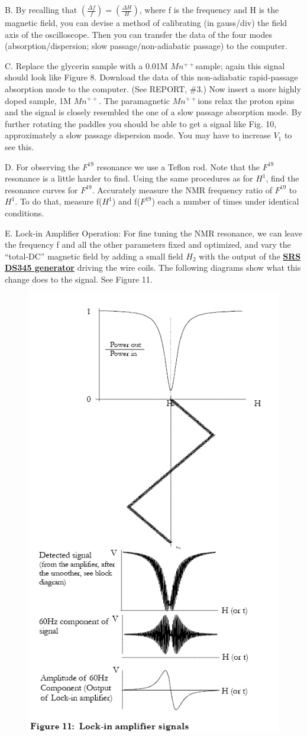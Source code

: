 \documentclass{../lab}
\begin{document}
B. By recalling that $ \left (\frac {\Delta f}{f} \right) = \left (\frac {\Delta H}{H} \right) $, where f is the frequency and H is the magnetic field, you can devise a method of calibrating (in gauss/div) the field axis of the oscilloscope. Then you can transfer the data of the four modes (absorption/dispersion; slow passage/non-adiabatic passage) to the computer.

C. Replace the glycerin sample with a 0.01M $Mn^{++}$sample; again this signal should look like Figure 8. Download the data of this non-adiabatic rapid-passage absorption mode to the computer. (See REPORT, \#3.) Now insert a more highly doped sample, 1M $Mn^{++}$. The paramagnetic $Mn^{++}$ions relax the proton spins and the signal is closely resembled the one of a slow passage absorption mode. By further rotating the paddles you should be able to get a signal like Fig. 10, approximately a slow passage dispersion mode. You may have to increase $V_1$ to see this.

D. For observing the $F^{19}$ resonance we use a Teflon rod. Note that the $F^{19}$ resonance is a little harder to find. Using the same procedures as for $ H^1$, find the resonance curves for  $F^{19}$. Accurately measure the NMR frequency ratio of  $F^{19}$ to $ H^1$. To do that, measure f($ H^1$) and f($F^{19}$) each a number of times under identical conditions.

E. Lock-in Amplifier Operation: For fine tuning the NMR resonance, we can leave the frequency f and all the other parameters fixed and optimized, and vary the ``total-DC'' magnetic field by adding a small field $H_2$ with the output of the \href{https://youtu.be/PrM8DHFOFS0}{\textbf{SRS DS345 generator}} driving the wire coils. The following diagrams show what this change does to the signal. See Figure 11.

\begin{figure}[h]
    \centering
    \href{http://experimentationlab.berkeley.edu/sites/default/files/images/NMR25.gif}{\includegraphics[width=0.5\linewidth]{images/NMR25.png}}
    \caption{}
    \label{fig:NMR25}
\end{figure}
\end{document}
